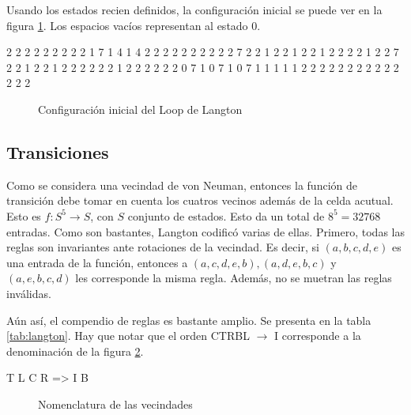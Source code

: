 \documentclass{article}
\begin{document}
Usando los estados recien definidos, la configuración inicial se puede ver en la
figura \ref{fig:langton-init}. Los espacios vacíos representan al estado 0.

\begin{verbbox}
  2 2 2 2 2 2 2 2
2 1 7   1 4   1 4 2
2   2 2 2 2 2 2   2
2 7 2         2 1 2
2 1 2         2 1 2
2   2         2 1 2
2 7 2         2 1 2
2 1 2 2 2 2 2 2 1 2 2 2 2 2
2 0 7 1 0 7 1 0 7 1 1 1 1 1 2
  2 2 2 2 2 2 2 2 2 2 2 2 2
\end{verbbox}

\begin{figure}
  \centering
  \theverbbox
  \caption{Configuración inicial del Loop de Langton}
  \label{fig:langton-init}
\end{figure}

\subsection{Transiciones}

Como se considera una vecindad de von Neuman, entonces la función de transición
debe tomar en cuenta los cuatros vecinos además de la celda acutual. Esto es
$f: S^{5}\to S$, con $S$ conjunto de estados. Esto da un total de $8^{5} =
32768$ entradas. Como son bastantes, Langton codificó varias de ellas. Primero,
todas las reglas son invariantes ante rotaciones de la vecindad.
Es decir, si $(a, b, c, d, e)$ es una entrada de la función, entonces a
$(a, c, d, e, b), (a, d, e, b, c)$ y $(a, e, b, c, d)$ les corresponde la misma
regla. Además, no se muetran las reglas inválidas.

Aún así, el compendio de reglas es bastante amplio. Se presenta en la tabla
\ref{tab:langton}. Hay que notar que el orden CTRBL $\to$ I corresponde a la
denominación de la figura \ref{fig:langton-nom}.

\begin{verbbox}
  T
L C R => I
  B
\end{verbbox}

\begin{figure}
  \centering
  \theverbbox
  \caption{Nomenclatura de las vecindades}
  \label{fig:langton-nom}
\end{figure}
\end{document}
